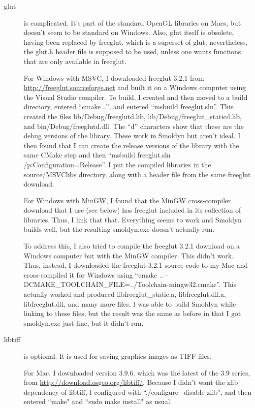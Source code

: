 \documentclass {book}
\begin{document}
\begin{description}

\item[glut] is complicated. It's part of the standard OpenGL libraries on Macs, but doesn't seem to be standard on Windows. Also, glut itself is obsolete, having been replaced by freeglut, which is a superset of glut; nevertheless, the glut.h header file is supposed to be used, unless one wants functions that are only available in freeglut.

For Windows with MSVC, I downloaded freeglut 3.2.1 from \url{http://freeglut.sourceforge.net} and built it on a Windows computer using the Visual Studio compiler. To build, I created and then moved to a build directory, entered ``cmake ..'', and entered ``msbuild freeglut.sln''. This created the files lib/Debug/freeglutd.lib, lib/Debug/freeglut\_staticd.lib, and bin/Debug/freeglutd.dll. The ``d'' characters show that these are the debug versions of the library. These work in Smoldyn but aren't ideal. I then found that I can create the release versions of the library with the same CMake step and then ``msbuild freeglut.sln /p:Configuration=Release''. I put the compiled libraries in the source/MSVClibs directory, along with a header file from the same freeglut download.

For Windows with MinGW, I found that the MinGW cross-compiler download that I use (see below) has freeglut included in its collection of libraries. Thus, I link that that. Everything seems to work and Smoldyn builds well, but the resulting smoldyn.exe doesn't actually run.

To address this, I also tried to compile the freeglut 3.2.1 download on a Windows computer but with the MinGW compiler. This didn't work. Thus, instead, I downloaded the freeglut 3.2.1 source code to my Mac and cross-compiled it for Windows using ``cmake .. -DCMAKE\_TOOLCHAIN\_FILE=../Toolchain-mingw32.cmake''. This actually worked and produced libfreeglut\_static.a, libfreeglut.dll.a, libfreeglut.dll, and many more files. I was able to build Smoldyn while linking to these files, but the result was the same as before in that I got smoldyn.exe just fine, but it didn't run.

\item[libtiff] is optional. It is used for saving graphics images as TIFF files.

For Mac, I downloaded version 3.9.6, which was the latest of the 3.9 series, from \url{http://download.osgeo.org/libtiff/}. Because I didn't want the zlib dependency of libtiff, I configured with ``./configure --disable-zlib", and then entered ``make" and ``sudo make install" as usual.


\end{description}
\end{document}
